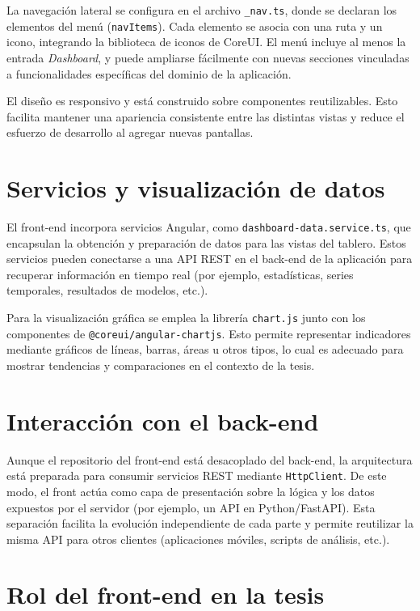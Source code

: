 La navegación lateral se configura en el archivo \texttt{_nav.ts}, donde se declaran los elementos del menú (\texttt{navItems}). Cada elemento se asocia con una ruta y un icono, integrando la biblioteca de iconos de CoreUI. El menú incluye al menos la entrada \textit{Dashboard}, y puede ampliarse fácilmente con nuevas secciones vinculadas a funcionalidades específicas del dominio de la aplicación.

El diseño es responsivo y está construido sobre componentes reutilizables. Esto facilita mantener una apariencia consistente entre las distintas vistas y reduce el esfuerzo de desarrollo al agregar nuevas pantallas.

\section{Servicios y visualización de datos}

El front-end incorpora servicios Angular, como \texttt{dashboard-data.service.ts}, que encapsulan la obtención y preparación de datos para las vistas del tablero. Estos servicios pueden conectarse a una API REST en el back-end de la aplicación para recuperar información en tiempo real (por ejemplo, estadísticas, series temporales, resultados de modelos, etc.).

Para la visualización gráfica se emplea la librería \texttt{chart.js} junto con los componentes de \texttt{@coreui/angular-chartjs}. Esto permite representar indicadores mediante gráficos de líneas, barras, áreas u otros tipos, lo cual es adecuado para mostrar tendencias y comparaciones en el contexto de la tesis.

\section{Interacción con el back-end}

Aunque el repositorio del front-end está desacoplado del back-end, la arquitectura está preparada para consumir servicios REST mediante \texttt{HttpClient}. De este modo, el front actúa como capa de presentación sobre la lógica y los datos expuestos por el servidor (por ejemplo, un API en Python/FastAPI). Esta separación facilita la evolución independiente de cada parte y permite reutilizar la misma API para otros clientes (aplicaciones móviles, scripts de análisis, etc.).

\section{Rol del front-end en la tesis}

